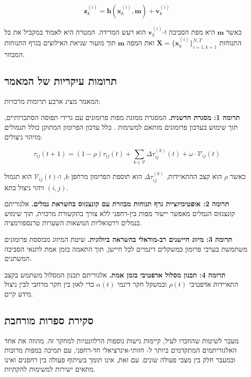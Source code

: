 \begin{equation}
\mathbf{z}_{k}^{(i)} = \mathbf{h}(\mathbf{x}_{k}^{(i)}, \mathbf{m}) + \mathbf{v}_{k}^{(i)}
\label{eq:observation_model}
\end{equation}

כאשר $\mathbf{m}$ היא מפת הסביבה ו-$\mathbf{v}_{k}^{(i)}$ הוא רעש המדידה. המטרה היא לאמוד במקביל את כל התנוחות $\mathbf{X} = \{\mathbf{x}_{k}^{(i)}\}_{i=1,k=1}^{N,T}$ ואת המפה $\mathbf{m}$ תוך מזעור שגיאת האילוצים בגרף התנוחות המבוזר.

\subsection{תרומות עיקריות של המאמר}
\label{sec:contributions}

המאמר מציג ארבע תרומות מרכזיות:

\textbf{תרומה 1: מסגרת  חדשנית.} המסגרת ממזגת מפות פרומונים עם גרידי תפוסה הסתברותיים, תוך שימוש בעדכון פרומונים מותאם למשימות . כלל עדכון הפרומון המתוקן כולל תגמולים מזיהוי ניצולים:

\begin{equation}
\tau_{ij}(t+1) = (1-\rho)\tau_{ij}(t) + \sum_{k \in \mathcal{V}} \Delta\tau_{ij}^{(k)}(t) + \omega \cdot \mathcal{V}_{ij}(t)
\label{eq:modified_pheromone}
\end{equation}

כאשר $\rho$ הוא קצב ההתאיידות, $\Delta\tau_{ij}^{(k)}$ הוא תוספת הפרומון מרחפן $k$, ו-$\mathcal{V}_{ij}(t)$ הוא תגמול זיהוי ניצול בתא $(i,j)$.

\textbf{תרומה 2: אופטימיזציית גרף תנוחות מבוזרת עם קונצנזוס בהשראת נמלים.} אלגוריתם קונצנזוס הנמלים מאפשר יישור מפות בין-רחפני ללא צורך בתקשורת מרכזית, תוך שימוש בנמלים וירטואליות הנושאות השערות טרנספורמציה.

\textbf{תרומה 3: מיזוג חיישנים רב-מודאלי בהשראה ביולוגית.} שיטת המיזוג מבוססת פרומונים משתמשת בערכי פרומון כמשקלים דינמיים לכל חיישן, תוך התאמה בזמן אמת לתנאי הסביבה המשתנים.

\textbf{תרומה 4: תכנון מסלול אדפטיבי בזמן אמת.} אלגוריתם תכנון המסלול משתמש בקצב התאיידות אדפטיבי $\rho(t)$ ובמשקל חקר דינמי $\alpha(t)$ כדי לאזן בין חקר מרחבי לבין ניצול מידע קיים.

\subsection{סקירת ספרות מורחבת}
\label{sec:literature_review}

מעבר לשיטות שהוזכרו לעיל, קיימות גישות נוספות הרלוונטיות למחקר זה.  \cite{Campos2021ORBSLAM3} מהווה את אחד האלגוריתמים המתקדמים ביותר ל- חזותי-אינרציאלי חד-רחפני, עם תמיכה במפות מרובות ובמעבר חלק בין מצבי פעולה שונים. עם זאת,  אינו תומך בשיתוף פעולה בין רחפנים ואינו מתאים ישירות למשימות  להקתיות.

